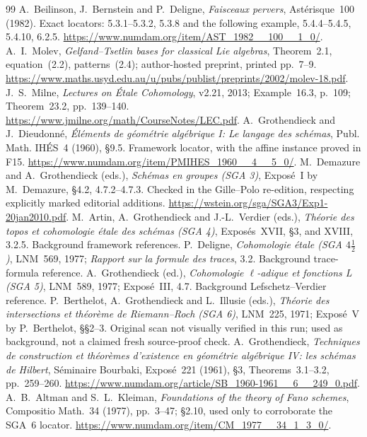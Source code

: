 \documentclass[11pt,a4paper]{article}
\theoremstyle{named}\newtheorem{finding}{Finding}[section]
\theoremstyle{definition}\newtheorem{definition}[finding]{Definition}
\theoremstyle{remark}\newtheorem{remark}[finding]{Remark}
\begin{document}
\begin{thebibliography}{99}
 A.~Beilinson, J.~Bernstein and P.~Deligne, \emph{Faisceaux pervers}, Ast\'erisque~100 (1982). Exact locators: 5.3.1--5.3.2, 5.3.8 and the following example, 5.4.4--5.4.5, 5.4.10, 6.2.5. \url{https://www.numdam.org/item/AST_1982__100__1_0/}.
 A.~I.~Molev, \emph{Gelfand--Tsetlin bases for classical Lie algebras}, Theorem~2.1, equation~(2.2), patterns~(2.4); author-hosted preprint, printed pp.~7--9. \url{https://www.maths.usyd.edu.au/u/pubs/publist/preprints/2002/molev-18.pdf}.
 J.~S.~Milne, \emph{Lectures on \'Etale Cohomology}, v2.21, 2013; Example~16.3, p.~109; Theorem~23.2, pp.~139--140. \url{https://www.jmilne.org/math/CourseNotes/LEC.pdf}.
 A.~Grothendieck and J.~Dieudonn\'e, \emph{\'El\'ements de g\'eom\'etrie alg\'ebrique I: Le langage des sch\'emas}, Publ. Math. IH\'ES~4 (1960), \S9.5. Framework locator, with the affine instance proved in F15. \url{https://www.numdam.org/item/PMIHES_1960__4__5_0/}.
 M.~Demazure and A.~Grothendieck (eds.), \emph{Sch\'emas en groupes (SGA 3)}, Expos\'e~I by M.~Demazure, \S4.2, 4.7.2--4.7.3. Checked in the Gille--Polo re-edition, respecting explicitly marked editorial additions. \url{https://wstein.org/sga/SGA3/Exp1-20jan2010.pdf}.
 M.~Artin, A.~Grothendieck and J.-L.~Verdier (eds.), \emph{Th\'eorie des topos et cohomologie \'etale des sch\'emas (SGA 4)}, Expos\'es~XVII, \S3, and XVIII, 3.2.5. Background framework references.
 P.~Deligne, \emph{Cohomologie \'etale (SGA $4\frac12$)}, LNM~569, 1977; \emph{Rapport sur la formule des traces}, 3.2. Background trace-formula reference.
 A.~Grothendieck (ed.), \emph{Cohomologie \(\ell\)-adique et fonctions L (SGA 5)}, LNM~589, 1977; Expos\'e~III, 4.7. Background Lefschetz--Verdier reference.
 P.~Berthelot, A.~Grothendieck and L.~Illusie (eds.), \emph{Th\'eorie des intersections et th\'eor\`eme de Riemann--Roch (SGA 6)}, LNM~225, 1971; Expos\'e~V by P.~Berthelot, \S\S2--3. Original scan not visually verified in this run; used as background, not a claimed fresh source-proof check.
 A.~Grothendieck, \emph{Techniques de construction et th\'eor\`emes d'existence en g\'eom\'etrie alg\'ebrique IV: les sch\'emas de Hilbert}, S\'eminaire Bourbaki, Expos\'e~221 (1961), \S3, Theorems~3.1--3.2, pp.~259--260. \url{https://www.numdam.org/article/SB_1960-1961__6__249_0.pdf}.
 A.~B.~Altman and S.~L.~Kleiman, \emph{Foundations of the theory of Fano schemes}, Compositio Math.~34 (1977), pp.~3--47; \S2.10, used only to corroborate the SGA~6 locator. \url{https://www.numdam.org/item/CM_1977__34_1_3_0/}.

\end{thebibliography}
\end{document}
